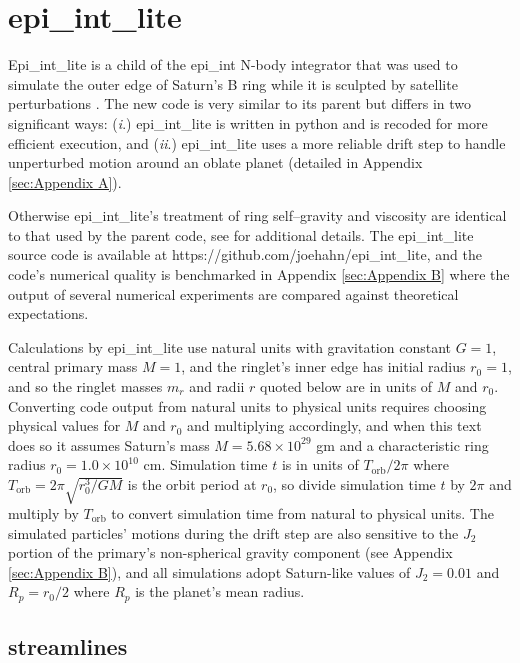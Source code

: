 \documentclass[preprint]{aastex62}
\begin{document}
\section{epi\_int\_lite}
\label{sec:epi_int_lite}

Epi\_int\_lite is a child of the epi\_int N-body integrator that was used to
simulate the outer edge of Saturn's B ring while it is sculpted by satellite perturbations
\citep{HS13}. The new code is very similar to its parent but differs in two significant ways:
({\it i}.) epi\_int\_lite is written in python and is recoded for more efficient execution, and
({\it ii}.) epi\_int\_lite uses a more reliable drift step to handle
unperturbed motion around an oblate planet (detailed in Appendix \ref{sec:Appendix A}).

Otherwise epi\_int\_lite's treatment of ring self--gravity and viscosity are identical
to that used by the parent code, see \cite{HS13} for additional details. The epi\_int\_lite 
source code is available at https://github.com/joehahn/epi\_int\_lite, and the
code's numerical quality is benchmarked in Appendix \ref{sec:Appendix B}
where the output of several numerical experiments are compared against theoretical expectations.

Calculations by epi\_int\_lite use natural units with gravitation constant $G=1$, 
central primary mass $M=1$, and the ringlet's inner edge has initial radius
$r_0=1$, and so the ringlet masses $m_r$ and radii $r$ quoted below are in units of $M$ and $r_0$.
Converting code output from natural units to physical units requires choosing	
physical values for $M$ and $r_0$ and multiplying accordingly, and when this text does so
it assumes Saturn's mass $M=5.68\times10^{29}$ gm and a characteristic
ring radius $r_0=1.0\times10^{10}$ cm. Simulation time $t$ is in units of $T_{\text{orb}}/2\pi$
where $T_{\text{orb}} = 2\pi\sqrt{r_0^3/GM}$ is the orbit period at $r_0$, 
so divide simulation time $t$ by $2\pi$ and multiply
by $T_{\text{orb}}$ to convert simulation time from natural to physical units.
The simulated particles' motions during the drift step are also
sensitive to the $J_2$ portion of the primary's non-spherical gravity component 
(see Appendix \ref{sec:Appendix B}), and all simulations
adopt Saturn-like values of $J_2=0.01$ and $R_p=r_0/2$ where $R_p$ is the planet's
mean radius.

\subsection{streamlines}
\label{subsec:streamlines}
\end{document}
